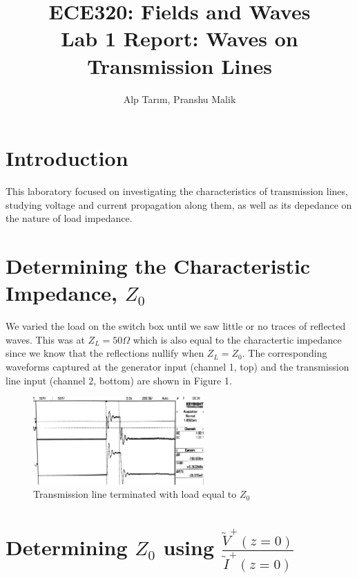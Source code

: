 \documentclass[10pt]{article}
\begin{document}
\title{\textbf{\Large{\textsc{ECE320:} Fields and Waves}} \\ \Large{Lab 1 Report: Waves on Transmission Lines}}
\author{Alp Tarım, Pranshu Malik}

\maketitle

\section{Introduction}

This laboratory focused on investigating the characteristics of transmission lines, studying voltage and current 
propagation along them, as well as its depedance on the nature of load impedance.


\section[Determining the Characteristic Impedance, Z0]{Determining the Characteristic Impedance, {$Z_0$}}

We varied the load on the switch box until we saw little or no traces of reflected waves.
This was at $Z_L = 50 \Omega$ which is also equal to the charactertic impedance 
since we know that the reflections nullify when $Z_L = Z_0$. The corresponding waveforms
captured at the generator input (channel 1, top) and the transmission line input (channel 2, bottom) 
are shown in Figure 1.

\begin{figure}[h]
    \centering
    \includegraphics[width=6.54cm]{../photos/lab1/load_matched.jpg}
    \caption{Transmission line terminated with load equal to $Z_0$}
    \label{simulation_figure}
\end{figure}


\section[Determining Z0 using V/I]{Determining $Z_0$ using $\frac{\tilde V^+(z=0)}{\tilde I^+(z=0)}$}
\end{document}
